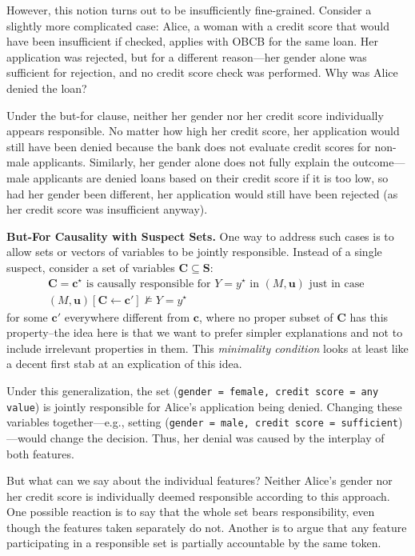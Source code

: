 \documentclass[anon,12pt]{clear2025} %
\renewcommand{\texttt}[1]{\lstinline[basicstyle=\fontsize{8pt}{8.25pt}\selectfont\ttfamily]{#1}}
\begin{document}
However, this notion turns out to be insufficiently fine-grained. Consider a slightly more complicated case: Alice, a woman with a credit score that would have been insufficient if checked, applies with OBCB for the same loan. Her application was rejected, but for a different reason---her gender alone was sufficient for rejection, and no credit score check was performed. Why was Alice denied the loan?  

Under the but-for clause, neither her gender nor her credit score individually appears responsible. No matter how high her credit score, her application would still have been denied because the bank does not evaluate credit scores for non-male applicants. Similarly, her gender alone does not fully explain the outcome—male applicants are denied loans based on their credit score if it is too low, so had her gender been different, her application would still have been rejected (as her credit score was insufficient anyway).

\vspace{2mm}
\noindent \textbf{But-For Causality with  Suspect Sets.} One way to address such cases is to allow sets or vectors of variables to be jointly responsible. Instead of a single suspect, consider a set of variables $\mathbf{C}\subseteq \mathbf{S}$:
\begin{align*}
\mathbf{C} = \mathbf{c}^\star \text{ is causally responsible for } Y = y^\star \text{ in } (M, \mathbf{u}) \text{ just in case } \\  (M, \mathbf{u})[\mathbf{C} \leftarrow \mathbf{c'}] \not \models Y= y ^\star
\end{align*}
for some $\mathbf{c'}$ everywhere different from $\mathbf{c}$, where no proper subset of $\mathbf{C}$ has this property--the idea here is that we want to prefer simpler explanations and not to include irrelevant properties in them. This \emph{minimality condition} looks at least like a decent first stab at an explication of this idea.


Under this generalization, the set (\texttt{gender = female, credit score = any value}) is jointly responsible for Alice's application being denied. Changing these variables together---e.g., setting (\texttt{gender = male, credit score = sufficient})---would change the decision. Thus, her denial was caused by the interplay of both features.

But what can we say about the individual features? Neither Alice’s gender nor her credit score is individually deemed responsible according to this approach. One possible reaction is to say that the whole set bears responsibility, even though the features taken separately do not. Another is to argue that any feature participating in a responsible set is partially accountable by the same token.  
\end{document}
